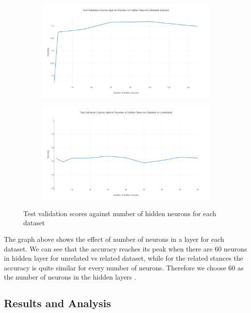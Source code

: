\documentclass[11.5pt]{article}
\begin{document}
\begin{figure}[h!]
  \begin{subfigure}{.5\textwidth}
    \centering
    \includegraphics[width=.9\linewidth]{plot_9}
  \end{subfigure}
  \begin{subfigure}{.5\textwidth}
    \centering
    \includegraphics[width=.9\linewidth]{plot_11}
  \end{subfigure}
  \caption{Test validation scores against number of hidden neurons for each dataset}
  \label{fig:neurons}
\end{figure}

The graph above shows the effect of number of neurons in a layer for each dataset. We can see that the accuracy reaches its peak when there are 60 neurons in hidden layer for unrelated vs related dataset, while for the related stances
the accuracy is quite similar for every number of neurons. Therefore we choose 60 as the number of neurons in the hidden layers	.

\subsection{Results and Analysis}
\end{document}
